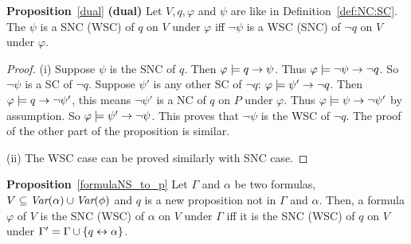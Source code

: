 \documentclass[letterpaper]{article} %
\begin{document}
\noindent\textbf{Proposition}~\ref{dual} \textbf{(dual)} Let $V,q,\varphi$ and $\psi$ are like in Definition~\ref{def:NC:SC}.
 The $\psi$ is a SNC (WSC) of $q$ on $V$ under $\varphi$ iff $\neg \psi$ is a WSC (SNC)
    of $\neg q$ on $V$ under $\varphi$.\\
\begin{proof}
     (i) Suppose $\psi$ is the SNC of $q$. Then $\varphi \models q \rightarrow \psi$. Thus $\varphi \models \neg \psi \rightarrow \neg q$. So $\neg \psi$ is a
SC of $\neg q$. Suppose $\psi'$ is any other SC of $\neg q$: $\varphi \models \psi' \rightarrow \neg q$. Then $\varphi \models q \rightarrow \neg \psi'$, this means $\neg \psi'$ is a NC of $q$ on $P$ under $\varphi$.
Thus $\varphi \models \psi \rightarrow \neg \psi'$ by assumption. So $\varphi \models \psi' \rightarrow \neg \psi$. This proves that $\neg \psi$ is the WSC of $\neg q$.
The proof of the other part of the proposition is similar.

(ii) The WSC case can be proved similarly with SNC case.
    \end{proof}




\noindent\textbf{Proposition}~\ref{formulaNS_to_p}   Let $\Gamma$ and $\alpha$ be two formulas, $V \subseteq \textit{Var}(\alpha) \cup \textit{Var}(\phi)$  and $q$ is a new proposition not in $\Gamma$ and $\alpha$.
 Then, a formula $\varphi$ of $V$ is the SNC (WSC) of $\alpha$ on $V$ under  $\Gamma$ iff it is the SNC (WSC) of $q$ on $V$ under $\Gamma' = \Gamma \cup \{q \leftrightarrow \alpha\}$.
\end{document}
